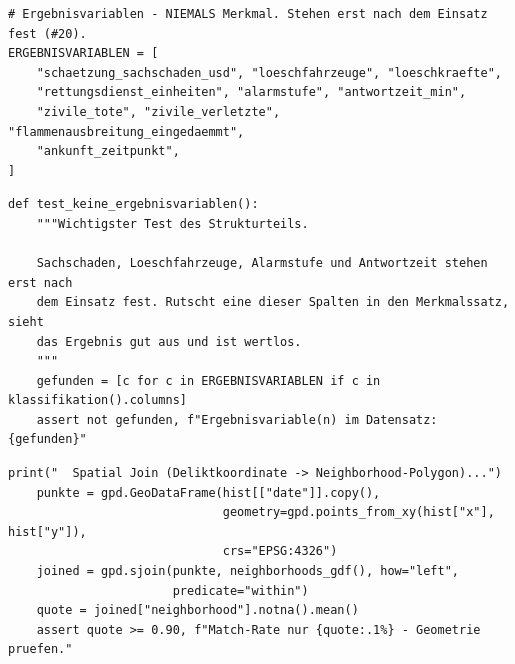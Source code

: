 
\begin{lstlisting}[style=pythonstil,
  label={lst:gesperrt},
  caption={Gesperrte Ergebnisvariablen
           (\texttt{prep/config.py}, Z.~168--174)}]
# Ergebnisvariablen - NIEMALS Merkmal. Stehen erst nach dem Einsatz fest (#20).
ERGEBNISVARIABLEN = [
    "schaetzung_sachschaden_usd", "loeschfahrzeuge", "loeschkraefte",
    "rettungsdienst_einheiten", "alarmstufe", "antwortzeit_min",
    "zivile_tote", "zivile_verletzte", "flammenausbreitung_eingedaemmt",
    "ankunft_zeitpunkt",
]
\end{lstlisting}


\begin{lstlisting}[style=pythonstil,
  label={lst:test-leakage},
  caption={Prüfung auf Ergebnisvariablen in der erzeugten Datei
           (\texttt{tests/test\_aufbereitung.py}, Z.~277--285)}]
def test_keine_ergebnisvariablen():
    """Wichtigster Test des Strukturteils.

    Sachschaden, Loeschfahrzeuge, Alarmstufe und Antwortzeit stehen erst nach
    dem Einsatz fest. Rutscht eine dieser Spalten in den Merkmalssatz, sieht
    das Ergebnis gut aus und ist wertlos.
    """
    gefunden = [c for c in ERGEBNISVARIABLEN if c in klassifikation().columns]
    assert not gefunden, f"Ergebnisvariable(n) im Datensatz: {gefunden}"
\end{lstlisting}



\begin{lstlisting}[style=pythonstil,
  label={lst:spatialjoin},
  caption={Räumlicher Verbund der Altquelle mit Abbruchschwelle
           (\texttt{prep/s1\_daten.py}, Z.~391--399)}]
    print("  Spatial Join (Deliktkoordinate -> Neighborhood-Polygon)...")
    punkte = gpd.GeoDataFrame(hist[["date"]].copy(),
                              geometry=gpd.points_from_xy(hist["x"], hist["y"]),
                              crs="EPSG:4326")
    joined = gpd.sjoin(punkte, neighborhoods_gdf(), how="left",
                       predicate="within")
    quote = joined["neighborhood"].notna().mean()
    assert quote >= 0.90, f"Match-Rate nur {quote:.1%} - Geometrie pruefen."
\end{lstlisting}



